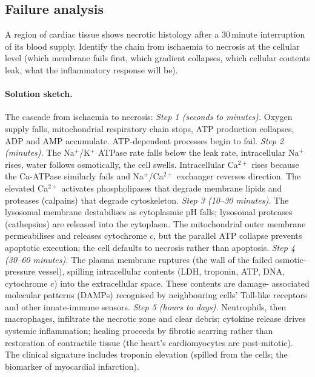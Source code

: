 \subsection*{Failure analysis}

\begin{exercise}
A region of cardiac tissue shows necrotic histology after a
$30\,\text{minute}$ interruption of its blood supply. Identify the
chain from ischaemia to necrosis at the cellular level (which
membrane fails first, which gradient collapses, which cellular
contents leak, what the inflammatory response will be).
\end{exercise}

\paragraph{Solution sketch.}
The cascade from ischaemia to necrosis:
\emph{Step 1 (seconds to minutes).} Oxygen supply falls, mitochondrial
respiratory chain stops, ATP production collapses, ADP and AMP
accumulate. ATP-dependent processes begin to fail.
\emph{Step 2 (minutes).} The Na$^+$/K$^+$ ATPase rate falls below
the leak rate, intracellular Na$^+$ rises, water follows osmotically,
the cell swells. Intracellular Ca$^{2+}$ rises because the Ca-ATPase
similarly fails and Na$^+$/Ca$^{2+}$ exchanger reverses direction. The
elevated Ca$^{2+}$ activates phospholipases that degrade membrane
lipids and proteases (calpains) that degrade cytoskeleton.
\emph{Step 3 (10--30 minutes).} The lysosomal membrane destabilises
as cytoplasmic pH falls; lysosomal proteases (cathepsins) are
released into the cytoplasm. The mitochondrial outer membrane
permeabilises and releases cytochrome $c$, but the parallel ATP
collapse prevents apoptotic execution; the cell defaults to necrosis
rather than apoptosis. \emph{Step 4 (30--60 minutes).} The plasma
membrane ruptures (the wall of the failed osmotic-pressure vessel),
spilling intracellular contents (LDH, troponin, ATP, DNA, cytochrome
$c$) into the extracellular space. These contents are damage-
associated molecular patterns (DAMPs) recognised by neighbouring
cells' Toll-like receptors and other innate-immune sensors.
\emph{Step 5 (hours to days).} Neutrophils, then macrophages, infiltrate
the necrotic zone and clear debris; cytokine release drives systemic
inflammation; healing proceeds by fibrotic scarring rather than
restoration of contractile tissue (the heart's cardiomyocytes are
post-mitotic). The clinical signature includes troponin elevation
(spilled from the cells; the biomarker of myocardial infarction).

